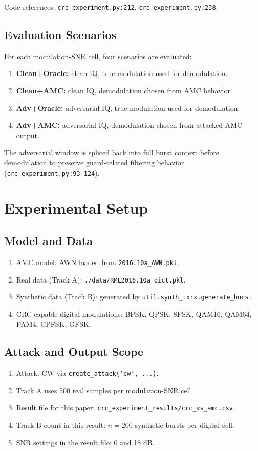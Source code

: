 Code references:
\texttt{crc\_experiment.py:212}, \texttt{crc\_experiment.py:238}.

\subsection{Evaluation Scenarios}
For each modulation-SNR cell, four scenarios are evaluated:
\begin{enumerate}
\item \textbf{Clean+Oracle:} clean IQ, true modulation used for demodulation.
\item \textbf{Clean+AMC:} clean IQ, demodulation chosen from AMC behavior.
\item \textbf{Adv+Oracle:} adversarial IQ, true modulation used for demodulation.
\item \textbf{Adv+AMC:} adversarial IQ, demodulation chosen from attacked AMC output.
\end{enumerate}

The adversarial window is spliced back into full burst context before demodulation to preserve
guard-related filtering behavior (\texttt{crc\_experiment.py:93--124}).

\section{Experimental Setup}
\subsection{Model and Data}
\begin{enumerate}
\item AMC model: AWN loaded from \texttt{2016.10a\_AWN.pkl}.
\item Real data (Track A): \texttt{./data/RML2016.10a\_dict.pkl}.
\item Synthetic data (Track B): generated by \texttt{util.synth\_txrx.generate\_burst}.
\item CRC-capable digital modulations: BPSK, QPSK, 8PSK, QAM16, QAM64, PAM4, CPFSK, GFSK.
\end{enumerate}

\subsection{Attack and Output Scope}
\begin{enumerate}
\item Attack: CW via \texttt{create\_attack('cw', ...)}.
\item Track A uses 500 real samples per modulation-SNR cell.
\item Result file for this paper: \texttt{crc\_experiment\_results/crc\_vs\_amc.csv}.
\item Track B count in this result: $n=200$ synthetic bursts per digital cell.
\item SNR settings in the result file: 0 and 18 dB.
\end{enumerate}

